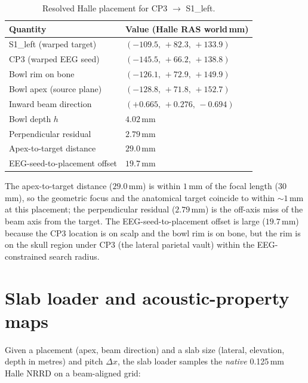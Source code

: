 \documentclass{compactarticle}
\begin{document}
\begin{table}[H]
\centering
\caption{Resolved Halle placement for CP3 $\rightarrow$
S1\_left.}\label{tab:placement_sample}
\begin{tabular}{ll}
\toprule
Quantity & Value (Halle RAS world\,mm) \\
\midrule
S1\_left (warped target)        & $(-109.5,\, +82.3,\, +133.9)$ \\
CP3 (warped EEG seed)           & $(-145.5,\, +66.2,\, +138.8)$ \\
Bowl rim on bone                & $(-126.1,\, +72.9,\, +149.9)$ \\
Bowl apex (source plane)        & $(-128.8,\, +71.8,\, +152.7)$ \\
Inward beam direction           & $(+0.665,\, +0.276,\, -0.694)$ \\
Bowl depth $h$                  & $4.02$\,mm \\
Perpendicular residual          & $2.79$\,mm \\
Apex-to-target distance         & $29.0$\,mm \\
EEG-seed-to-placement offset    & $19.7$\,mm \\
\bottomrule
\end{tabular}
\end{table}

The apex-to-target distance ($29.0$\,mm) is within $1$\,mm of the
focal length ($30$\,mm), so the geometric focus and the anatomical
target coincide to within $\sim$$1$\,mm at this placement; the
perpendicular residual ($2.79$\,mm) is the off-axis miss of the beam
axis from the target. The EEG-seed-to-placement offset is large
($19.7$\,mm) because the CP3 location is on scalp and the bowl rim is
on bone, but the rim is on the skull region under CP3 (the lateral
parietal vault) within the EEG-constrained search radius.

\section{Slab loader and acoustic-property maps}\label{sec:slab}
Given a placement (apex, beam direction) and a slab size (lateral,
elevation, depth in metres) and pitch $\Delta x$, the slab loader
samples the {\em native} 0.125\,mm Halle NRRD on a beam-aligned grid:
\end{document}
